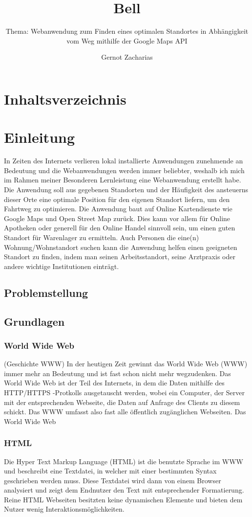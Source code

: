 \documentclass[a4paper, twoside, 12pt]{scrreprt}
\title{Bell}
\author{Gernot Zacharias}
\subtitle{Thema: Webanwendung zum Finden eines optimalen Standortes in Abhängigkeit vom Weg mithilfe der Google Maps API}
\begin{document}
\maketitle
\cleardoublepage
\chapter {Inhaltsverzeichnis}

\setcounter{page}{1}
\chapter {Einleitung}
In Zeiten des Internets verlieren lokal installierte Anwendungen zunehmende an Bedeutung und die Webanwendungen werden immer beliebter, weshalb ich mich im Rahmen meiner Besonderen Lernleistung eine Webanwendung erstellt habe. Die Anwendung soll aus gegebenen Standorten und der Häufigkeit des ansteuerns dieser Orte eine optimale Position für den eigenen Standort liefern, um den Fahrtweg zu optimieren. Die Anwendung baut auf Online Kartendienste wie Google Maps und Open Street Map zurück. Dies kann vor allem für Online Apotheken oder generell für den Online Handel sinnvoll sein, um einen guten Standort für Warenlager zu ermitteln. Auch Personen die eine(n) Wohnung/Wohnstandort suchen kann die Anwendung helfen einen geeigneten Standort zu finden, indem man seinen Arbeitsstandort, seine Arztpraxis oder andere wichtige Institutionen einträgt.
\section {Problemstellung}

\section{Grundlagen}
\subsection{World Wide Web}
(Geschichte WWW)
In der heutigen Zeit gewinnt das World Wide Web (WWW) immer mehr an Bedeutung und ist fast schon nicht mehr wegzudenken. Das World Wide Web ist der Teil des Internets, in dem die Daten mithilfe des HTTP/HTTPS -Protkolls ausgetauscht werden, wobei ein Computer, der Server mit der entsprechenden Webseite, die Daten auf Anfrage des Clients zu diesem schickt. Das WWW umfasst also fast alle öffentlich zugänglichen Webseiten.
Das World Wide Web~\citep{www}
\subsection{HTML}
Die Hyper Text Markup Language (HTML) ist die benutzte Sprache im WWW und beschreibt eine Textdatei, in welcher mit einer bestimmten Syntax geschrieben werden muss. Diese Textdatei wird dann von einem Browser analysiert und zeigt dem Endnutzer den Text mit entsprechender Formatierung. Reine HTML Webseiten besitzten keine dynamischen Elemente und bieten dem Nutzer wenig Interaktionsmöglichkeiten.
\end{document}
